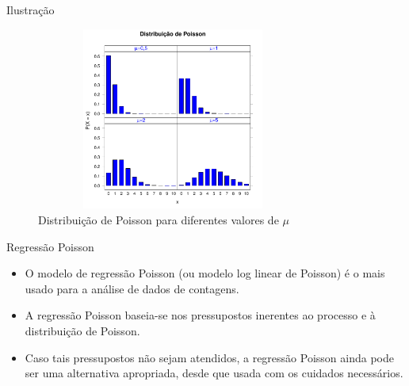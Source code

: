 \documentclass[10pt, aspectratio=169]{beamer}
\begin{document}


\begin{frame}{Ilustração}
    
    \begin{figure}[h]
    \includegraphics[height=6cm,width=9cm]{images/graf1.pdf}
    \caption{Distribuição de Poisson para diferentes valores de $\mu$}
    \label{Fig1}
    \centering
    
\end{figure}
\end{frame}



\begin{frame}{Regressão Poisson} 

\begin{itemize}
    \item O modelo de regressão Poisson (ou modelo log linear de Poisson) é o mais usado para a análise de dados de contagens.
    
    \vspace{0,5cm}
    
    \item A regressão Poisson baseia-se nos pressupostos inerentes ao processo e à distribuição de Poisson.
    
    \vspace{0,5cm}
    
    \item Caso tais pressupostos não sejam atendidos, a regressão Poisson ainda pode ser uma alternativa apropriada, desde que usada com os cuidados necessários.
    
\end{itemize}

\end{frame}
\end{document}
